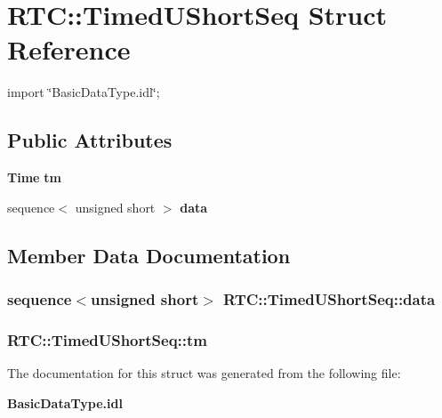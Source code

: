 \section{RTC::TimedUShortSeq Struct Reference}
\label{structRTC_1_1TimedUShortSeq}


{\ttfamily import \char`\"{}BasicDataType.idl\char`\"{};}

\subsection*{Public Attributes}
\begin{DoxyCompactItemize}
\item 
{\bf Time} {\bf tm}
\item 
sequence$<$ unsigned short $>$ {\bf data}
\end{DoxyCompactItemize}


\subsection{Member Data Documentation}
\subsubsection[{data}]{\setlength{\rightskip}{0pt plus 5cm}sequence$<$unsigned short$>$ {\bf RTC::TimedUShortSeq::data}}\label{structRTC_1_1TimedUShortSeq_a6cb2fb6b13889f2f3b2b0770091665f0}
\subsubsection[{tm}]{ {\bf RTC::TimedUShortSeq::tm}}\label{structRTC_1_1TimedUShortSeq_aeeda8eae16460106bee7b7163fb4ffd6}


The documentation for this struct was generated from the following file:\begin{DoxyCompactItemize}
\item 
{\bf BasicDataType.idl}\end{DoxyCompactItemize}
